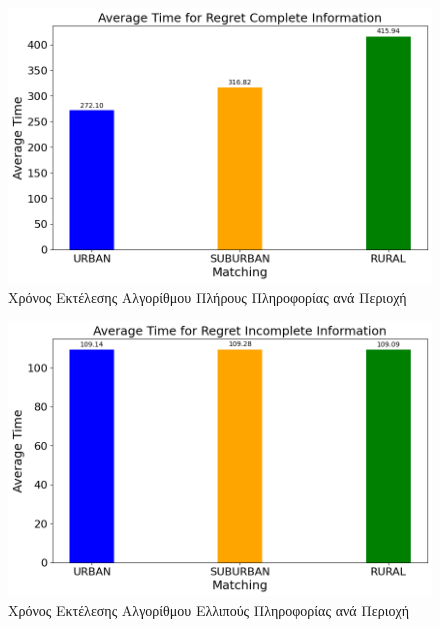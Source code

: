 \begin{figure}[H]
    \centering
    \includegraphics[width=\textwidth]{figures/chapter4/Average_Time_per_area_RCI.png}
    \caption{Χρόνος Εκτέλεσης Αλγορίθμου Πλήρους Πληροφορίας ανά Περιοχή}
    \label{fig43}
\end{figure}

\begin{figure}[H]
    \centering
    \includegraphics[width=\textwidth]{figures/chapter4/Average_Time_per_area_RII.png}
    \caption{Χρόνος Εκτέλεσης Αλγορίθμου Ελλιπούς Πληροφορίας ανά Περιοχή}
    \label{fig44}
\end{figure}

